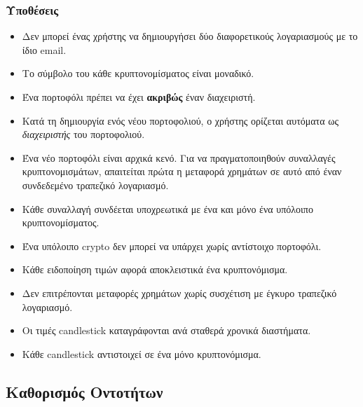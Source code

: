 \documentclass[a4paper,12pt]{article}
\begin{document}
\subsubsection*{Υποθέσεις}
\begin{itemize}
    \item Δεν μπορεί ένας χρήστης να δημιουργήσει δύο διαφορετικούς λογαριασμούς με το ίδιο 
    email.
    \item Το σύμβολο του κάθε κρυπτονομίσματος είναι μοναδικό.
    \item Ένα πορτοφόλι πρέπει να έχει \textbf{ακριβώς} έναν διαχειριστή.
    \item Κατά τη δημιουργία ενός νέου πορτοφολιού, ο χρήστης ορίζεται αυτόματα ως 
    \textit{διαχειριστής} του πορτοφολιού.
    \item Ένα νέο πορτοφόλι είναι αρχικά κενό. Για να πραγματοποιηθούν συναλλαγές κρυπτονομισμάτων, 
    απαιτείται πρώτα η μεταφορά χρημάτων σε αυτό από έναν συνδεδεμένο τραπεζικό λογαριασμό.
    \item Κάθε συναλλαγή συνδέεται υποχρεωτικά με ένα και μόνο ένα υπόλοιπο κρυπτονομίσματος.
    \item Ένα υπόλοιπο crypto δεν μπορεί να υπάρχει 
    χωρίς αντίστοιχο πορτοφόλι.
    \item Κάθε ειδοποίηση τιμών αφορά αποκλειστικά ένα κρυπτονόμισμα.
    \item Δεν επιτρέπονται μεταφορές χρημάτων χωρίς συσχέτιση με έγκυρο τραπεζικό λογαριασμό.
    \item Οι τιμές candlestick καταγράφονται ανά σταθερά 
    χρονικά διαστήματα.
    \item Κάθε candlestick αντιστοιχεί σε ένα μόνο κρυπτονόμισμα.
\end{itemize}

\subsection{Καθορισμός Οντοτήτων}

\end{document}
